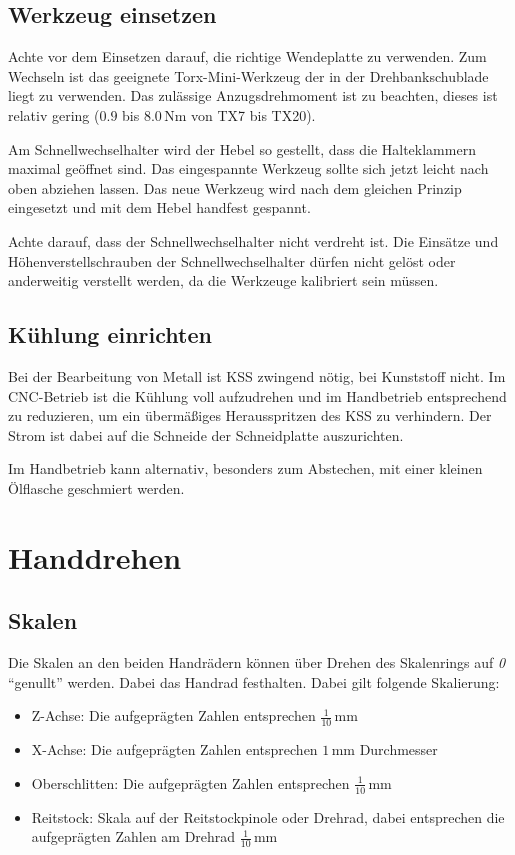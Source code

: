 \documentclass{\basedir/fablab-document}
\begin{document}
\subsection{Werkzeug einsetzen} %
Achte vor dem Einsetzen darauf, die richtige Wendeplatte zu verwenden. Zum Wechseln ist das geeignete Torx-Mini-Werkzeug der in der Drehbankschublade liegt zu verwenden. Das zulässige Anzugsdrehmoment ist zu beachten, dieses ist relativ gering ($0.9$ bis $8.0$\,Nm von TX7 bis TX20).

Am Schnellwechselhalter wird der Hebel so gestellt, dass die Halteklammern maximal geöffnet sind.
Das eingespannte Werkzeug sollte sich jetzt leicht nach oben abziehen lassen.
Das neue Werkzeug wird nach dem gleichen Prinzip eingesetzt und mit dem Hebel handfest gespannt.

Achte darauf, dass der Schnellwechselhalter nicht verdreht ist. Die Einsätze und Höhenverstellschrauben der Schnellwechselhalter dürfen nicht gelöst oder anderweitig verstellt werden, da die Werkzeuge kalibriert sein müssen.

\subsection{Kühlung einrichten}

Bei der Bearbeitung von Metall ist KSS zwingend nötig, bei Kunststoff nicht.
Im CNC-Betrieb ist die Kühlung voll aufzudrehen und im Handbetrieb entsprechend zu reduzieren,
um ein übermäßiges Herausspritzen des KSS zu verhindern.
Der Strom ist dabei auf die Schneide der Schneidplatte auszurichten.

Im Handbetrieb kann alternativ, besonders zum Abstechen, mit einer kleinen Ölflasche geschmiert werden. 

\newpage
\section{Handdrehen}
\label{handdrehen}
\subsection{Skalen}

Die Skalen an den beiden Handrädern können über Drehen des Skalenrings auf \emph{0} \enquote{genullt} werden.
Dabei das Handrad festhalten.
Dabei gilt folgende Skalierung:
\begin{itemize}
\item Z-Achse: Die aufgeprägten Zahlen entsprechen $\frac{1}{10}$\,mm 
\item X-Achse: Die aufgeprägten Zahlen entsprechen $1$\,mm Durchmesser
\item Oberschlitten: Die aufgeprägten Zahlen entsprechen $\frac{1}{10}$\,mm 
\item Reitstock: Skala auf der Reitstockpinole oder Drehrad, dabei entsprechen die aufgeprägten Zahlen am Drehrad $\frac{1}{10}$\,mm
\end{itemize}
\end{document}
